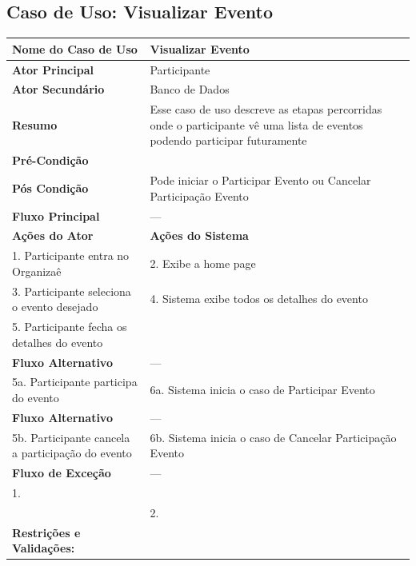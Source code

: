 \documentclass[12pt,a4paper]{article}
\begin{document}
\subsection{Caso de Uso: Visualizar Evento}
\begin{longtable}{|p{4cm}|p{11cm}|}
\hline
\textbf{Nome do Caso de Uso} & Visualizar Evento \\ \hline
\textbf{Ator Principal} & Participante \\ \hline
\textbf{Ator Secundário} & Banco de Dados \\ \hline
\textbf{Resumo} & Esse caso de uso descreve as etapas percorridas onde o participante vê uma lista de eventos podendo participar futuramente \\ \hline
\textbf{Pré-Condição} & \\ \hline
\textbf{Pós Condição} & Pode iniciar o Participar Evento ou Cancelar Participação Evento \\ \hline
\textbf{Fluxo Principal} & --- \\ \hline
\textbf{Ações do Ator} & \textbf{Ações do Sistema} \\ \hline
1. Participante entra no Organizaê & 2. Exibe a home page \\ \hline
3. Participante seleciona o evento desejado & 4. Sistema exibe todos os detalhes do evento \\ \hline
5. Participante fecha os detalhes do evento & \\ \hline
\textbf{Fluxo Alternativo} & --- \\ \hline
5a. Participante participa do evento & 6a. Sistema inicia o caso de Participar Evento \\ \hline
\textbf{Fluxo Alternativo} & --- \\ \hline
5b. Participante cancela a participação do evento & 6b. Sistema inicia o caso de Cancelar Participação Evento \\ \hline
\textbf{Fluxo de Exceção} & --- \\ \hline
1. & \\ \hline
& 2. \\ \hline
\textbf{Restrições e Validações:} & \\ \hline
\end{longtable}

\vspace{1cm}
\end{document}
